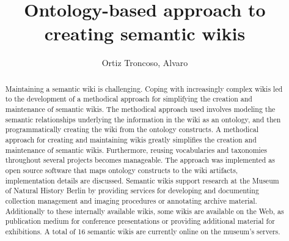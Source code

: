 \documentclass[manuscript,screen,review]{acmart}
\begin{document}
\title{Ontology-based approach to creating semantic wikis}

\author{Ortiz Troncoso, Alvaro}


\begin{abstract}
Maintaining a semantic wiki is challenging. Coping with increasingly complex wikis led to the development of a methodical approach for simplifying the creation and maintenance of semantic wikis.
The methodical approach used involves modeling the semantic relationships underlying the information in the wiki as an ontology, and then programmatically creating the wiki from the ontology constructs.
A methodical approach for creating and maintaining wikis greatly simplifies the creation and maintenance of semantic wikis. Furthermore, reusing vocabularies and taxonomies throughout several projects becomes manageable.
The approach was implemented as open source software that maps ontology constructs to the wiki artifacts, implementation details are discussed.
Semantic wikis support research at the Museum of Natural History Berlin by providing services for developing and documenting collection management and imaging procedures or annotating archive material. Additionally to these internally available wikis, some wikis are available on the Web, as publication medium for conference presentations or providing additional material for exhibitions. A total of 16 semantic wikis are currently online on the museum's servers.
\end{abstract}
\end{document}
